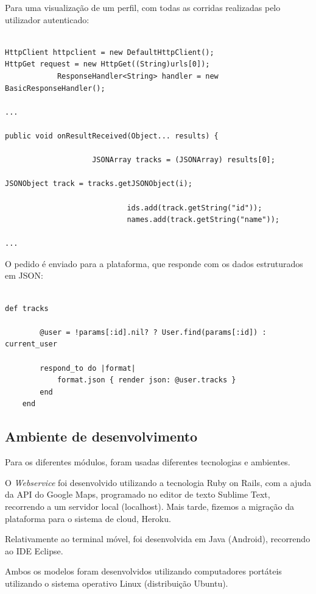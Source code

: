 \documentclass[15pt,a4paper]{article}
\begin{document}
Para uma visualização de um perfil, com todas as corridas realizadas pelo utilizador autenticado:

\begin{verbatim}

HttpClient httpclient = new DefaultHttpClient();
HttpGet request = new HttpGet((String)urls[0]);
            ResponseHandler<String> handler = new BasicResponseHandler();

...

public void onResultReceived(Object... results) {

					JSONArray tracks = (JSONArray) results[0];
					
JSONObject track = tracks.getJSONObject(i);
							
							ids.add(track.getString("id"));
							names.add(track.getString("name"));

...

\end{verbatim}

O pedido é enviado para a plataforma, que responde com os dados estruturados em JSON:

\begin{verbatim}

def tracks
		
		@user = !params[:id].nil? ? User.find(params[:id]) : current_user
		
		respond_to do |format|
      		format.json { render json: @user.tracks }
    	end
	end

\end{verbatim}


\subsection{Ambiente de desenvolvimento}

Para os diferentes módulos, foram usadas diferentes tecnologias e ambientes.

O \textit{Webservice} foi desenvolvido utilizando a tecnologia Ruby on Rails, com a ajuda da API do Google Maps, programado no editor de texto Sublime Text, recorrendo a um servidor local (localhost). Mais tarde, fizemos a migração da plataforma para o sistema de cloud, Heroku.

Relativamente ao terminal móvel, foi desenvolvida em Java (Android), recorrendo ao IDE Eclipse. 

Ambos os modelos foram desenvolvidos utilizando computadores portáteis utilizando o sistema operativo Linux (distribuição Ubuntu).
\end{document}
